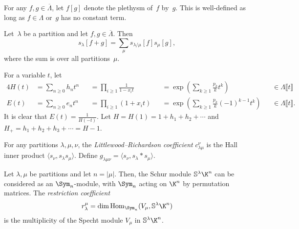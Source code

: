 For any $f, g \in \overline{\Lambda}$, let $f[g]$ denote the plethysm of~$f$ by~$g$. This is well-defined as long as $f \in \Lambda$ or~$g$ has no constant term.

\begin{prop}\label{proposition:plethysticaddition}
    Let~$\lambda$ be a partition and let $f, g \in \overline{\Lambda}$. Then
    \[s_{\lambda}[f + g] = \sum_{\mu} s_{\lambda / \mu}[f] s_\mu[g],\] where the sum is over all partitions~$\mu$.
\end{prop}

For a variable $t$, let
\begin{alignat*}{4}
H(t) &= \sum_{n \geq 0} h_n t^n &&= \prod_{i \geq 1} \frac{1}{1 - x_i t} &&= \exp\left(\sum_{k \geq 1} \frac{p_k}{k}t^k\right)&&\in \Lambda \llbracket t \rrbracket \\
E(t) &= \sum_{n \geq 0} e_n t^n &&= \prod_{i \geq 1} (1 + x_i t) &&= \exp\left(\sum_{k \geq 1} \frac{p_k}{k} (-1)^{k-1} t^k\right) &&\in \Lambda \llbracket t \rrbracket.
\end{alignat*}
It is clear that $E(t) = \frac{1}{H(-t)}$. Let $H = H(1) = 1 + h_1 + h_2 + \cdots$ and $H_+ = h_1 + h_2 + h_3 + \cdots = H - 1$.

For any partitions $\lambda, \mu, \nu$, the \emph{Littlewood--Richardson coefficient} $c^\nu_{\lambda\mu}$ is the Hall inner product $\langle s_\nu, s_\lambda s_\mu \rangle$. Define $g_{\lambda\mu\nu} = \langle s_\nu, s_\lambda \ast s_\mu \rangle$.

\begin{defi}\label{definition:restriction}
    Let $\lambda, \mu$ be partitions and let $n = |\mu|$. Then, the Schur module $\mathbb{S}^\lambda \K^n$ can be considered as an $\Sym_n$-module, with $\Sym_n$ acting on $\K^n$ by permutation matrices. The \emph{restriction coefficient} \[r_\lambda^\mu = \dim \operatorname{Hom}_{\Sym_n}(V_\mu, \mathbb{S}^\lambda \K^n)\] is the multiplicity of the Specht module $V_\mu$ in $\mathbb{S}^\lambda \K^n$. 
\end{defi}


